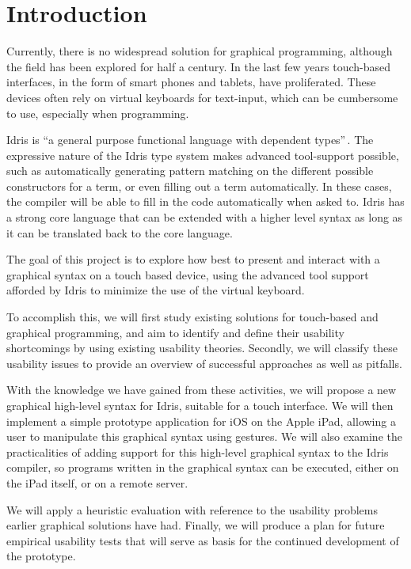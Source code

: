 \section{Introduction}
\label{sec:Introduction}

Currently, there is no widespread solution for graphical programming, although the field has been explored for half a century. In the last few years touch-based interfaces, in the form of smart phones and tablets, have proliferated. These devices often rely on virtual keyboards for text-input, which can be cumbersome to use, especially when programming. 

Idris is “a general purpose functional language with dependent types”\,\cite{brady2013idris}. The expressive nature of the Idris type system makes advanced tool-support possible, such as automatically generating pattern matching on the different possible constructors for a term, or even filling out a term automatically. In these cases, the compiler will be able to fill in the code automatically when asked to. Idris has a strong core language that can be extended with a higher level syntax as long as it can be translated back to the core language.

The goal of this project is to explore how best to present and interact with a graphical syntax on a touch based device, using the advanced tool support afforded by Idris to minimize the use of the virtual keyboard.

To accomplish this, we will first study existing solutions for touch-based and graphical programming, and aim to identify and define their usability shortcomings by using existing usability theories. Secondly, we will classify these usability issues to provide an overview of successful approaches as well as pitfalls.

With the knowledge we have gained from these activities, we will propose a new graphical high-level syntax for Idris, suitable for a touch interface. We will then implement a simple prototype application for iOS on the Apple iPad, allowing a user to manipulate this graphical syntax using gestures. We will also examine the practicalities of adding support for this high-level graphical syntax to the Idris compiler, so programs written in the graphical syntax can be executed, either on the iPad itself, or on a remote server.

We will apply a heuristic evaluation with reference to the usability problems earlier graphical solutions have had. Finally, we will produce a plan for future empirical usability tests that will serve as basis for the continued development of the prototype.


